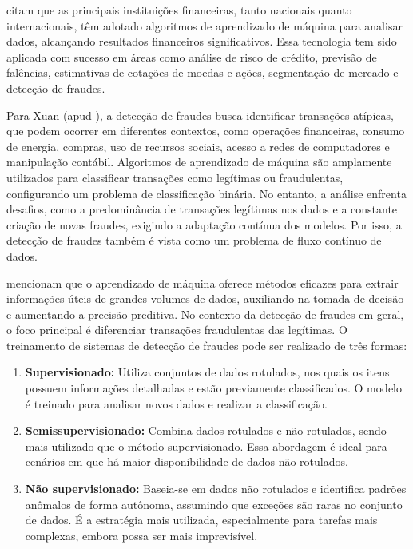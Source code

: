 \documentclass[12pt,a4paper]{article}
\begin{document}
\cite{martins2022} citam que as principais instituições financeiras, tanto nacionais quanto internacionais, têm adotado algoritmos de aprendizado de máquina para analisar dados, alcançando resultados financeiros significativos. Essa tecnologia tem sido aplicada com sucesso em áreas como análise de risco de crédito, previsão de falências, estimativas de cotações de moedas e ações, segmentação de mercado e detecção de fraudes.

Para Xuan (apud \cite{martins2022}), a detecção de fraudes busca identificar transações atípicas, que podem ocorrer em diferentes contextos, como operações financeiras, consumo de energia, compras, uso de recursos sociais, acesso a redes de computadores e manipulação contábil. Algoritmos de aprendizado de máquina são amplamente utilizados para classificar transações como legítimas ou fraudulentas, configurando um problema de classificação binária. No entanto, a análise enfrenta desafios, como a predominância de transações legítimas nos dados e a constante criação de novas fraudes, exigindo a adaptação contínua dos modelos. Por isso, a detecção de fraudes também é vista como um problema de fluxo contínuo de dados.

\cite{gupta2020} mencionam que o aprendizado de máquina oferece métodos eficazes para extrair informações úteis de grandes volumes de dados, auxiliando na tomada de decisão e aumentando a precisão preditiva. No contexto da detecção de fraudes em geral, o foco principal é diferenciar transações fraudulentas das legítimas. O treinamento de sistemas de detecção de fraudes pode ser realizado de três formas:
\begin{enumerate}
    \item \textbf{Supervisionado:} Utiliza conjuntos de dados rotulados, nos quais os itens possuem informações detalhadas e estão previamente classificados. O modelo é treinado para analisar novos dados e realizar a classificação.
    \item \textbf{Semissupervisionado:} Combina dados rotulados e não rotulados, sendo mais utilizado que o método supervisionado. Essa abordagem é ideal para cenários em que há maior disponibilidade de dados não rotulados.
    \item \textbf{Não supervisionado:} Baseia-se em dados não rotulados e identifica padrões anômalos de forma autônoma, assumindo que exceções são raras no conjunto de dados. É a estratégia mais utilizada, especialmente para tarefas mais complexas, embora possa ser mais imprevisível.
\end{enumerate}
\end{document}

